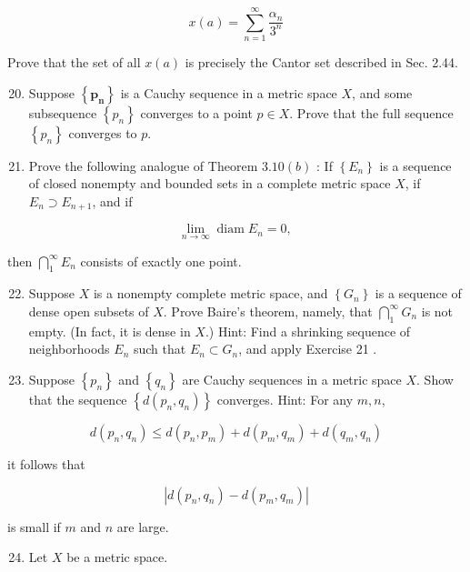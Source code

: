 \documentclass[10pt]{article}
\begin{document}
$$
x(a)=\sum_{n=1}^{\infty} \frac{\alpha_{n}}{3^{n}}
$$

Prove that the set of all $x(a)$ is precisely the Cantor set described in Sec. 2.44.

\begin{enumerate}
  \setcounter{enumi}{19}
  \item Suppose $\left\{\boldsymbol{p}_{\boldsymbol{n}}\right\}$ is a Cauchy sequence in a metric space $X$, and some subsequence $\left\{p_{n}\right\}$ converges to a point $p \in X$. Prove that the full sequence $\left\{p_{n}\right\}$ converges to $p$.

  \item Prove the following analogue of Theorem $3.10(b)$ : If $\left\{E_{n}\right\}$ is a sequence of closed nonempty and bounded sets in a complete metric space $X$, if $E_{n} \supset E_{n+1}$, and if

\end{enumerate}

$$
\lim _{n \rightarrow \infty} \operatorname{diam} E_{n}=0 \text {, }
$$

then $\bigcap_{1}^{\infty} E_{n}$ consists of exactly one point.

\begin{enumerate}
  \setcounter{enumi}{21}
  \item Suppose $X$ is a nonempty complete metric space, and $\left\{G_{n}\right\}$ is a sequence of dense open subsets of $X$. Prove Baire's theorem, namely, that $\bigcap_{1}^{\infty} G_{n}$ is not empty. (In fact, it is dense in $X$.) Hint: Find a shrinking sequence of neighborhoods $E_{n}$ such that $E_{n} \subset G_{n}$, and apply Exercise 21 .

  \item Suppose $\left\{p_{n}\right\}$ and $\left\{q_{n}\right\}$ are Cauchy sequences in a metric space $X$. Show that the sequence $\left\{d\left(p_{n}, q_{n}\right)\right\}$ converges. Hint: For any $m, n$,

\end{enumerate}

$$
d\left(p_{n}, q_{n}\right) \leq d\left(p_{n}, p_{m}\right)+d\left(p_{m}, q_{m}\right)+d\left(q_{m}, q_{n}\right)
$$

it follows that

$$
\left|d\left(p_{n}, q_{n}\right)-d\left(p_{m}, q_{m}\right)\right|
$$

is small if $m$ and $n$ are large.

\begin{enumerate}
  \setcounter{enumi}{23}
  \item Let $X$ be a metric space.
\end{enumerate}
\end{document}
